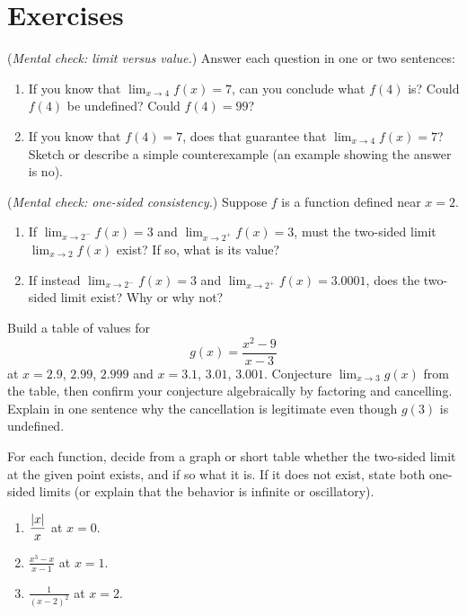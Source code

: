 \section{Exercises}

\begin{exercise}
(\emph{Mental check: limit versus value.}) Answer each question in one or two sentences:
\begin{enumerate}[label=(\alph*)]
  \item If you know that $\lim_{x\to 4} f(x) = 7$, can you conclude what $f(4)$ is? Could $f(4)$ be undefined? Could $f(4) = 99$?
  \item If you know that $f(4) = 7$, does that guarantee that $\lim_{x\to 4} f(x) = 7$? Sketch or describe a simple counterexample (an example showing the answer is no).
\end{enumerate}
\end{exercise}

\begin{exercise}
(\emph{Mental check: one-sided consistency.}) Suppose $f$ is a function defined near $x = 2$.
\begin{enumerate}[label=(\alph*)]
  \item If $\lim_{x\to 2^-} f(x) = 3$ and $\lim_{x\to 2^+} f(x) = 3$, must the two-sided limit $\lim_{x\to 2} f(x)$ exist? If so, what is its value?
  \item If instead $\lim_{x\to 2^-} f(x) = 3$ and $\lim_{x\to 2^+} f(x) = 3.0001$, does the two-sided limit exist? Why or why not?
\end{enumerate}
\end{exercise}

\begin{exercise}
Build a table of values for
\[
  g(x) = \frac{x^2 - 9}{x - 3}
\]
at $x = 2.9$, $2.99$,
$2.999$ and $x = 3.1$, $3.01$, $3.001$. Conjecture $\lim_{x\to 3} g(x)$ from the table, then confirm
your conjecture algebraically by factoring and cancelling. Explain in one sentence why the
cancellation is legitimate even though $g(3)$ is undefined.
\end{exercise}

\begin{exercise}
For each function, decide from a graph or short table whether the two-sided limit at the given
point exists, and if so what it is. If it does not exist, state both one-sided limits (or explain
that the behavior is infinite or oscillatory).
\begin{enumerate}[label=(\alph*)]
  \item $\displaystyle \frac{\lvert x\rvert}{x}$ at $x = 0$.
  \item $\displaystyle \frac{x^3 - x}{x - 1}$ at $x = 1$.
  \item $\displaystyle \frac{1}{(x-2)^2}$ at $x = 2$.
\end{enumerate}
\end{exercise}

